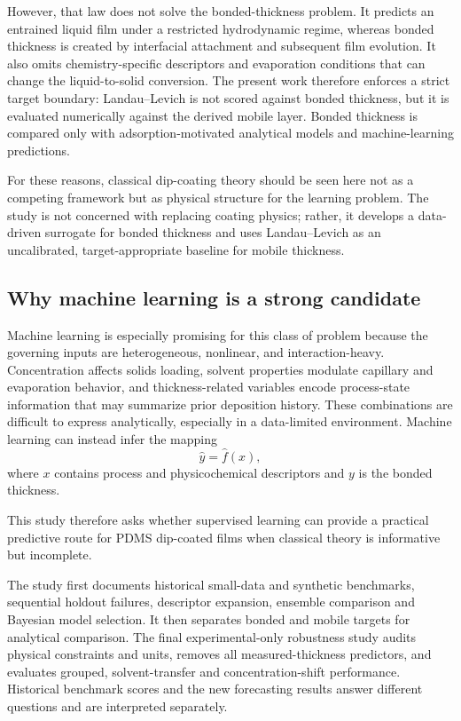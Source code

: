 \documentclass[11pt]{article}
\begin{document}
However, that law does not solve the bonded-thickness problem. It predicts an entrained liquid film under a restricted hydrodynamic regime, whereas bonded thickness is created by interfacial attachment and subsequent film evolution. It also omits chemistry-specific descriptors and evaporation conditions that can change the liquid-to-solid conversion. The present work therefore enforces a strict target boundary: Landau--Levich is not scored against bonded thickness, but it is evaluated numerically against the derived mobile layer. Bonded thickness is compared only with adsorption-motivated analytical models and machine-learning predictions.

For these reasons, classical dip-coating theory should be seen here not as a competing framework but as physical structure for the learning problem. The study is not concerned with replacing coating physics; rather, it develops a data-driven surrogate for bonded thickness and uses Landau--Levich as an uncalibrated, target-appropriate baseline for mobile thickness.

\subsection{Why machine learning is a strong candidate}
Machine learning is especially promising for this class of problem because the governing inputs are heterogeneous, nonlinear, and interaction-heavy. Concentration affects solids loading, solvent properties modulate capillary and evaporation behavior, and thickness-related variables encode process-state information that may summarize prior deposition history. These combinations are difficult to express analytically, especially in a data-limited environment. Machine learning can instead infer the mapping
\begin{equation}
\hat{y} = \hat{f}(x),
\end{equation}
where $x$ contains process and physicochemical descriptors and $y$ is the bonded thickness.

This study therefore asks whether supervised learning can provide a practical predictive route for PDMS dip-coated films when classical theory is informative but incomplete.

The study first documents historical small-data and synthetic benchmarks, sequential holdout failures, descriptor expansion, ensemble comparison and Bayesian model selection. It then separates bonded and mobile targets for analytical comparison. The final experimental-only robustness study audits physical constraints and units, removes all measured-thickness predictors, and evaluates grouped, solvent-transfer and concentration-shift performance. Historical benchmark scores and the new forecasting results answer different questions and are interpreted separately.
\end{document}
